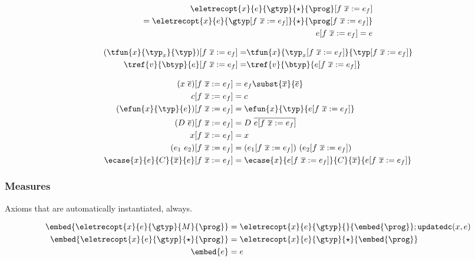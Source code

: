 \begin{align*}
{\eletrecopt{x}{e}{\gtyp}{\star}{\prog}}\inline{f\ \overline{x}}{e_f}\\
  = \eletrecopt{x}{e}{\gtyp\inline{f\ \overline{x}}{e_f}}{\star}{\prog\inline{f\ \overline{x}}{e_f}}\\
e\inline{f\ \overline{x}}{e_f} = e 
\end{align*}


\begin{align*}
(\tfun{x}{\typ_x}{\typ})\inline{f\ \overline{x}}{e_f}
 = & \tfun{x}{\typ_x\inline{f\ \overline{x}}{e_f}}{\typ\inline{f\ \overline{x}}{e_f}}\\
\tref{v}{\btyp}{e}\inline{f\ \overline{x}}{e_f}
 = & \tref{v}{\btyp}{e\inline{f\ \overline{x}}{e_f}}
\end{align*}

\begin{align*}
(x\ \overline{e})\inline{f\ \overline{x}}{e_f} &= e_f\subst{\overline{x}}{\overline{e}}\\
c\inline{f\ \overline{x}}{e_f} &= c \\
(\efun{x}{\typ}{e})\inline{f\ \overline{x}}{e_f} &=  
\efun{x}{\typ}{e\inline{f\ \overline{x}}{e_f}}\\
(D\ \overline{e})\inline{f\ \overline{x}}{e_f} &=  
D\ \overline{e\inline{f\ \overline{x}}{e_f}}\\
x\inline{f\ \overline{x}}{e_f} &= x \\
(e_1 \ e_2)\inline{f\ \overline{x}}{e_f} &=  (e_1\inline{f\ \overline{x}}{e_f})\ (e_2\inline{f\ \overline{x}}{e_f})\\
\ecase{x}{e}{C}{\overline{x}}{e}\inline{f\ \overline{x}}{e_f} &= 
\ecase{x}{e\inline{f\ \overline{x}}{e_f}}{C}{\overline{x}}{e\inline{f\ \overline{x}}{e_f}}
\end{align*}


\newcommand\updatedcty[2]{\ensuremath{\mathtt{updatedc}(#1, #2)}\xspace}

\subsubsection{Measures}
  Axioms that are automatically instantiated, always.

\begin{align*}
\embed{\eletrecopt{x}{e}{\gtyp}{M}{\prog}}
  &= \eletrecopt{x}{e}{\gtyp}{}{\embed{\prog}}
; \updatedcty{x}{e} \\
\embed{\eletrecopt{x}{e}{\gtyp}{\star}{\prog}}
  &= \eletrecopt{x}{e}{\gtyp}{\star}{\embed{\prog}}\\
\embed{e} &= e 
\end{align*}


